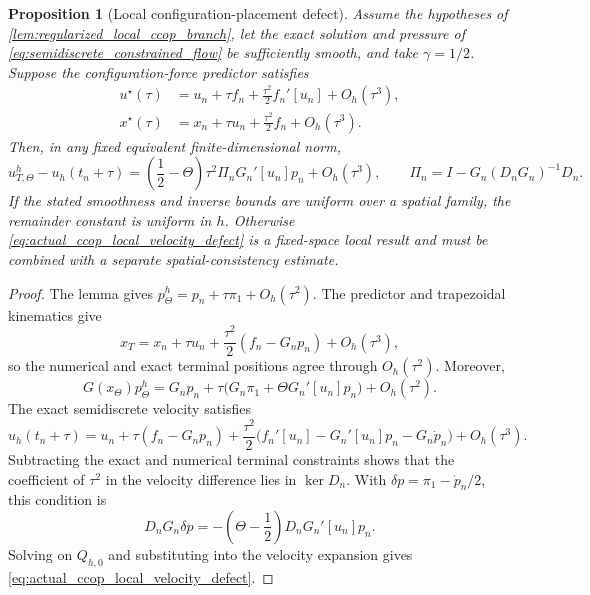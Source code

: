 \documentclass[11pt]{article}
\theoremstyle{plain}
\newtheorem{proposition}[theorem]{Proposition}
\theoremstyle{definition}
\theoremstyle{remark}
\newcommand{\kernel}{\operatorname{ker}}
\newcommand{\Th}{\Theta}
\begin{document}
\begin{proposition}[Local configuration-placement defect]
\label{prop:actual_ccop_local_defect}
Assume the hypotheses of
\cref{lem:regularized_local_ccop_branch}, let the exact solution and pressure
of \eqref{eq:semidiscrete_constrained_flow} be sufficiently smooth, and take
$\gamma=1/2$.  Suppose the configuration-force predictor satisfies
\begin{align}
 u^\star(\tau)
 &=u_n+\tau f_n+\frac{\tau^2}{2}f_n'[u_n]+O_h(\tau^3),
 \label{eq:second_order_force_velocity_predictor}\\
 x^\star(\tau)
 &=x_n+\tau u_n+\frac{\tau^2}{2}f_n+O_h(\tau^3).
 \label{eq:second_order_force_position_predictor}
\end{align}
Then, in any fixed equivalent finite-dimensional norm,
\begin{equation}
 u_{T,\Th}^h-u_h(t_n+\tau)
 =\left(\frac12-\Th\right)\tau^2
   \Pi_n G_n'[u_n]p_n+O_h(\tau^3),
 \qquad
 \Pi_n=I-G_n(D_nG_n)^{-1}D_n.
 \label{eq:actual_ccop_local_velocity_defect}
\end{equation}
If the stated smoothness and inverse bounds are uniform over a spatial family,
the remainder constant is uniform in $h$.  Otherwise
\eqref{eq:actual_ccop_local_velocity_defect} is a fixed-space local result and
must be combined with a separate spatial-consistency estimate.
\end{proposition}

\begin{proof}
The lemma gives
$p_\Th^h=p_n+\tau\pi_1+O_h(\tau^2)$.  The predictor and trapezoidal
kinematics give
\begin{equation*}
 x_T=x_n+\tau u_n+\frac{\tau^2}{2}(f_n-G_np_n)+O_h(\tau^3),
\end{equation*}
so the numerical and exact terminal positions agree through $O_h(\tau^2)$.
Moreover,
\begin{equation*}
 G(x_\Th)p_\Th^h
 =G_np_n+\tau\bigl(G_n\pi_1+\Th G_n'[u_n]p_n\bigr)
  +O_h(\tau^2).
\end{equation*}
The exact semidiscrete velocity satisfies
\begin{equation*}
 u_h(t_n+\tau)=u_n+\tau(f_n-G_np_n)
 +\frac{\tau^2}{2}
 \bigl(f_n'[u_n]-G_n'[u_n]p_n-G_n\dot p_n\bigr)
 +O_h(\tau^3).
\end{equation*}
Subtracting the exact and numerical terminal constraints shows that the
coefficient of $\tau^2$ in the velocity difference lies in $\kernel D_n$.
With $\delta p=\pi_1-\dot p_n/2$, this condition is
\begin{equation*}
 D_nG_n\delta p
 =-\left(\Th-\frac12\right)D_nG_n'[u_n]p_n.
\end{equation*}
Solving on $Q_{h,0}$ and substituting into the velocity expansion gives
\eqref{eq:actual_ccop_local_velocity_defect}.
\end{proof}
\end{document}
